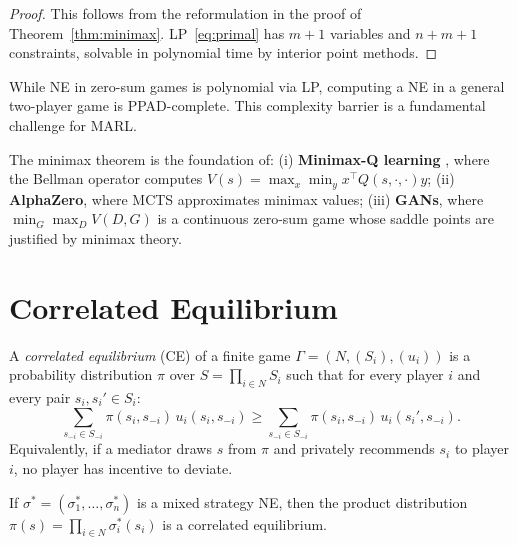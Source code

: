 \documentclass[11pt,a4paper]{article}
\begin{document}
\begin{proof}
This follows from the reformulation in the proof of
Theorem~\ref{thm:minimax}. LP~\eqref{eq:primal} has $m + 1$ variables and
$n + m + 1$ constraints, solvable in polynomial time by interior point
methods.
\end{proof}

\begin{warning}
While NE in zero-sum games is polynomial via LP, computing a NE in a general
two-player game is PPAD-complete. This complexity barrier is a fundamental
challenge for MARL.
\end{warning}

\begin{rlconnection}
The minimax theorem is the foundation of: (i) \textbf{Minimax-Q learning}
\citep{shoham2008}, where the Bellman operator computes
$V(s) = \max_x \min_y x^\top Q(s, \cdot, \cdot) y$; (ii) \textbf{AlphaZero},
where MCTS approximates minimax values; (iii) \textbf{GANs}, where
$\min_G \max_D V(D,G)$ is a continuous zero-sum game whose saddle points are
justified by minimax theory.
\end{rlconnection}


\section{Correlated Equilibrium}
\label{sec:correlated}

\begin{definition}
\label{def:ce}
A \emph{correlated equilibrium} (CE) of a finite game
$\Gamma = (N, (S_i), (u_i))$ is a probability distribution $\pi$ over
$S = \prod_{i \in N} S_i$ such that for every player $i$ and every pair
$s_i, s_i' \in S_i$:
\[
    \sum_{s_{-i} \in S_{-i}} \pi(s_i, s_{-i})\, u_i(s_i, s_{-i})
    \geq \sum_{s_{-i} \in S_{-i}} \pi(s_i, s_{-i})\, u_i(s_i', s_{-i}).
\]
Equivalently, if a mediator draws $s$ from $\pi$ and privately recommends
$s_i$ to player $i$, no player has incentive to deviate.
\end{definition}

\begin{keyresult}
\begin{theorem}[Every NE Is a CE]
\label{thm:ne_is_ce}
If $\sigma^* = (\sigma_1^*, \ldots, \sigma_n^*)$ is a mixed strategy NE,
then the product distribution
$\pi(s) = \prod_{i \in N} \sigma_i^*(s_i)$ is a correlated equilibrium.
\end{theorem}
\end{keyresult}
\end{document}

